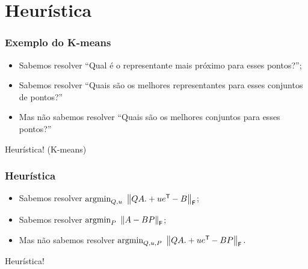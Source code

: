 
\section{Heurística}

\begin{frame}
  \frametitle{Exemplo do K-means}
  \begin{itemize}
    \item Sabemos resolver ``Qual é o representante mais próximo para esses pontos?'';
    \item Sabemos resolver ``Quais são os melhores representantes para esses conjuntos de pontos?''
    \item Mas não sabemos resolver ``Quais são os melhores conjuntos para esses pontos?''
  \end{itemize}

  \begin{center}
    Heurística! (K-means)
  \end{center}
\end{frame}

\begin{frame}[fragile]
  \frametitle{Heurística}
  \begin{itemize}
    \item Sabemos resolver $\text{argmin}_{Q,u}\,\, \left\lVert QA .+ u e^{\mathsf{T}\mkern-1mu} - B\right\rVert_\mathsf{F}$;
    \item Sabemos resolver $\text{argmin}_{P}\,\, \left\lVert A - BP\right\rVert_\mathsf{F}$;
    \item Mas não sabemos resolver $\text{argmin}_{Q,u,P}\,\, \left\lVert QA .+ u e^{\mathsf{T}\mkern-1mu} - BP\right\rVert_\mathsf{F}.$
  \end{itemize}

  \begin{center}
    Heurística!
  \end{center}
\end{frame}
